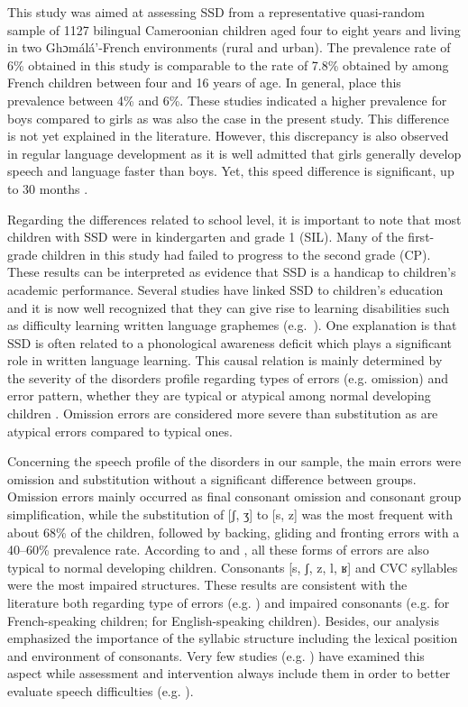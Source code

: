 \documentclass[output=paper,newtxmath,modfonts,nonflat,draftmode]{langsci/langscibook}
\begin{document}
This study was aimed at assessing SSD from a representative quasi-random sample of 1127 bilingual Cameroonian children aged four to eight years and living in two Ghɔmálá’-French environments (rural and urban). The prevalence rate of 6\% obtained in this study is comparable to the rate of 7.8\% obtained by \citet{Fombonne1997} among French children between four and 16 years of age. In general, \citet{Kirkpatrick1984} place this prevalence between 4\% and 6\%. These studies indicated a higher prevalence for boys compared to girls as was also the case in the present study. This difference is not yet explained in the literature. However, this discrepancy is also observed in regular language development as it is well admitted that girls generally develop speech and language faster than boys. Yet, this speed difference is significant, up to 30 months \citep{Eriksson2012}. 

Regarding the differences related to school level, it is important to note that most children with SSD were in kindergarten and grade 1 (SIL). Many of the first-grade children in this study had failed to progress to the second grade (CP). These results can be interpreted as evidence that SSD is a handicap to children's academic performance. Several studies have linked SSD to children's education and it is now well recognized that they can give rise to learning disabilities such as difficulty learning written language graphemes (e.g.~\citealt{Rvachew2007}). One explanation is that SSD is often related to a phonological awareness deficit which plays a significant role in written language learning. This causal relation is mainly determined by the severity of the disorders profile regarding types of errors (e.g. omission) and error pattern, whether they are typical or atypical among normal developing children \cite{RvachewChiangEvans2007}. Omission errors are considered more severe than substitution as are atypical errors compared to typical ones.

Concerning the speech profile of the disorders in our sample, the main errors were omission and substitution without a significant difference between groups. Omission errors mainly occurred as final consonant omission and consonant group simplification, while the substitution of [ʃ, ʒ] to [s, z] was the most frequent with about 68\% of the children, followed by backing, gliding and fronting errors with a 40--60\% prevalence rate. According to \citet{RvachewChiangEvans2007} and \citet{Fox2001}, all these forms of errors are also typical to normal developing children. Consonants [s, ʃ, z, l, ʁ] and CVC syllables were the most impaired structures. These results are consistent with the literature both regarding type of errors (e.g. \citealt{Austin1997,Ruscello1991}) and impaired consonants (e.g. \citet{Maurin-Cherou1993} for French-speaking children; \citet{Shriberg1994} for English-speaking children). Besides, our analysis emphasized the importance of the syllabic structure including the lexical position and environment of consonants. Very few studies (e.g. \citealt{RvachewChiangEvans2007}) have examined this aspect while assessment and intervention always include them in order to better evaluate speech difficulties (e.g. \citealt{Maurin-Cherou1993}). 
\end{document}
